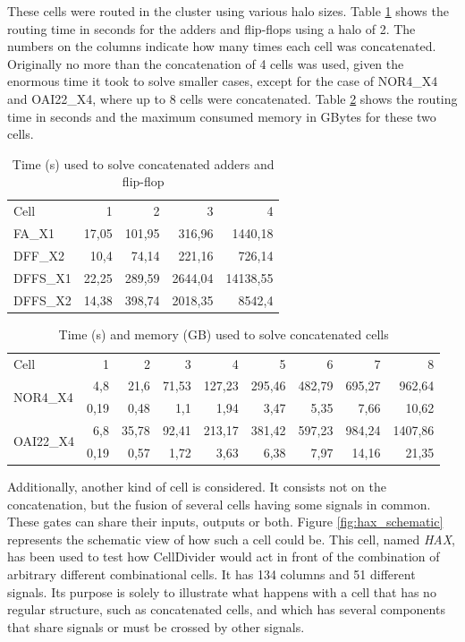 These cells were routed in the cluster using various halo sizes. Table \ref{tab:base_concat} shows the routing time in seconds for the adders and flip-flops using a halo of 2. The numbers on the columns indicate how many times each cell was concatenated. Originally no more than the concatenation of 4 cells was used, given the enormous time it took to solve smaller cases, except for the case of NOR4\_X4 and OAI22\_X4, where up to 8 cells were concatenated. Table \ref{tab:base_combintional} shows the routing time in seconds and the maximum consumed memory in GBytes for these two cells. \\


\begin{table}
\centering
\begin{tabular}{|l|r|r|r|r|}
\cline{1-5}
Cell & 1 & 2 & 3 & 4 \\ \cline{1-5}
FA\_X1 & 17,05 & 101,95 & 316,96 & 1440,18 \\ \hline
DFF\_X2 & 10,4 & 74,14 & 221,16 & 726,14 \\ \hline
DFFS\_X1 & 22,25 & 289,59 & 2644,04 & 14138,55 \\ \hline
DFFS\_X2 & 14,38 & 398,74 & 2018,35 & 8542,4 \\ \hline \cline{1-5}
\end{tabular} 
\caption{Time (s) used to solve concatenated adders and flip-flop}
\label{tab:base_concat}
\end{table}


\begin{table}
\centering
\begin{tabular}{|l|r|r|r|r|r|r|r|r|}
\cline{1-9}
Cell & 1 & 2 & 3 & 4 & 5 & 6 & 7 & 8\\ \cline{1-9}
\multirow{2}{*}{NOR4\_X4} & 4,8 & 21,6 & 71,53 & 127,23 & 295,46 & 482,79 & 695,27 & 962,64\\
& 0,19 & 0,48 & 1,1 & 1,94 & 3,47 & 5,35 & 7,66 & 10,62  \\ \hline
\multirow{2}{*}{OAI22\_X4} & 6,8 & 35,78 & 92,41 & 213,17 & 381,42 & 597,23 & 984,24 & 1407,86 \\
& 0,19 & 0,57 & 1,72 & 3,63 & 6,38 & 7,97 & 14,16 & 21,35 \\ \hline \cline{1-9}
\end{tabular} 
\caption{Time (s) and memory (GB) used to solve concatenated cells}
\label{tab:base_combintional}
\end{table}

Additionally, another kind of cell is considered. It consists not on the concatenation, but the fusion of several cells having some signals in common. These gates can share their inputs, outputs or both. Figure \ref{fig:hax_schematic} represents the schematic view of how such a cell could be. This cell, named \textit{HAX}, has been used to test how CellDivider would act in front of the combination of arbitrary different combinational cells. It has 134 columns and 51 different signals. Its purpose is solely to illustrate what happens with a cell that has no regular structure, such as concatenated cells, and which has several components that share signals or must be crossed by other signals.

